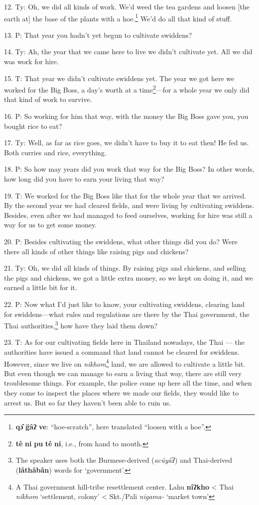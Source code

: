 12. Ty: Oh, we did all kinds of work. We'd weed the tea gardens and loosen [the
earth at] the base of the plants with a hoe.\footnote{\textbf{qɔ̂} \textbf{g̈âʔ} \textbf{ve}: ``hoe-scratch'', here translated ``loosen with a hoe''.} We'd do all that kind of stuff.

13. P: That year you hadn't yet begun to cultivate swiddens?

14. Ty: Ah, the year that we came here to live we didn't cultivate yet. All we
did was work for hire.

15. T: That year we didn't cultivate swiddens yet. The year we got here we worked
for the Big Boss, a day's worth at a time\footnote{\textbf{tê} \textbf{ni} \textbf{pu} \textbf{tê} \textbf{ni}, i.e., from hand to mouth.}---for a whole year we only did that
kind of work to survive.

16. P: So working for him that way, with the money the Big Boss gave you, you bought
rice to eat?

17. Ty: Well, as far as rice goes, we didn't have to buy it to eat then! He fed
us. Both curries and rice, everything.

18. P: So how may years did you work that way for the Big Boss? In other words,
how long did you have to earn your living that way?

19. T: We worked for the Big Boss like that for the whole year that we arrived.
By the second year we had cleared fields, and were living by cultivating swiddens.
Besides, even after we had managed to feed ourselves, working for hire was still
a way for us to get some money.

20. P: Besides cultivating the swiddens, what other things did you do? Were there
all kinds of other things like raising pigs and chickens?

21. Ty: Oh, we did all kinds of things. By raising pigs and chickens, and selling
the pigs and chickens, we got a little extra money, so we kept on doing it, and
we earned a little bit for it.

22. P: Now what I'd just like to know, your cultivating swiddens, clearing land
for swiddens---what rules and regulations are there by the Thai government, the
Thai authorities,\footnote{The speaker uses both the Burmese-derived (\textit{acúyà}ʔ) and Thai-derived (\textbf{lâthâbân}) words for `government'.} how have they laid them down?

23. T: As for our cultivating fields here in Thailand nowadays, the Thai --- the
authorities have issued a command that land cannot be cleared for swiddens. However,
since we live on \textit{nikhom}\footnote{A Thai government hill-tribe resettlement center. Lahu \textbf{nîʔkho} < Thai \textit{níkhom} `settlement, colony' < Skt./Pali \textit{nigama-} `market town'} land, we are allowed to cultivate a little
bit. But even though we can manage to earn a living that way, there are still very
troublesome things. For example, the police come up here all the time, and when
they come to inspect the places where we made our fields, they would like to arrest
us. But so far they haven't been able to ruin us.


